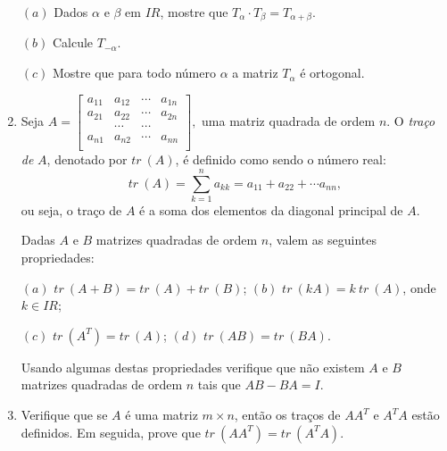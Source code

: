 \documentclass{report}
\newcommand{\real}{I\!\!R}               %
\begin{document}
\begin{Exercise}
\begin{enumerate}
$(a)$ Dados $\alpha$ e $\beta$ em $\real$, mostre que $T_\alpha
\cdot T_\beta = T_{\alpha +\beta}$.

$(b)$ Calcule $T_{-\alpha}$.

$(c)$ Mostre que para todo número $\alpha$ a matriz $T_\alpha$ é
ortogonal.



\item \label{1lista18}  Seja $A=\left[
\begin{array}{cccc}
  a_{11} & a_{12} & \cdots & a_{1n} \\
  a_{21} & a_{22} & \cdots & a_{2n} \\
  & \cdots & \cdots & \\
  a_{n1} & a_{n2} & \cdots & a_{nn} \\
\end{array}
\right],$ uma matriz quadrada de ordem $n$. O {\it traço de} $A$,
denotado por $tr \ (A)$, é definido como sendo o número real: $$
tr \ (A) = \sum_{k=1}^{n}a_{kk} = a_{11} + a_{22} + \cdots
a_{nn},$$
 ou seja, o traço de $A$ é a soma dos elementos da diagonal
 principal de $A$.

Dadas $A$ e $B$ matrizes quadradas de ordem $n$, valem as
seguintes propriedades:

$(a)$  $tr \ ( A+B) = tr \ ( A) + tr \ ( B) $; \hspace{1cm} $(b)$
$tr \ (kA)  =k \ tr \ (A) $, onde $k \in \real$;

$(c)$ $tr \ (A^T) =tr \ (A) $; \hspace{3.3cm} $(d)$ $tr \ (AB) =tr
\ (BA)$.

Usando algumas destas propriedades verifique que não existem $A$ e
$B$ matrizes quadradas de ordem $n$ tais que $AB-BA=I$.



\item \label{1lista19} Verifique que se $A$ é uma matriz $m\times
n$, então os traços de $AA^{T}$ e $A^{T}A$ estão definidos. Em
seguida, prove que $tr \ (AA^{T}) =tr \ ( A^{T}A)$.




\end{enumerate}
\end{Exercise}
\end{document}
